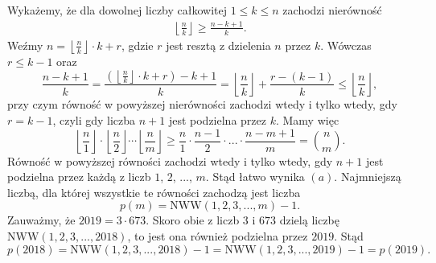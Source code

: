 \noindent
Wykażemy, że dla dowolnej liczby całkowitej $1 \leqslant k \leqslant n$ zachodzi nierówność
\begin{align*}
	\left \lfloor \frac{n}{k} \right \rfloor \geqslant \frac{n - k + 1}{k}.
\end{align*}
Weźmy $n = \left \lfloor \frac{n}{k} \right \rfloor \cdot k + r$, gdzie $r$ jest resztą z dzielenia $n$ przez $k$. Wówczas $r \leqslant k - 1$ oraz 
\[
	\frac{n - k + 1}{k} = \frac{\left (\left \lfloor \frac{n}{k} \right \rfloor \cdot k + r\right ) - k + 1}{k} = \left \lfloor \frac{n}{k} \right \rfloor + \frac{r - (k - 1)}{k} \leqslant \left \lfloor \frac{n}{k} \right \rfloor,
\]
przy czym równość w powyższej nierówności zachodzi wtedy i tylko wtedy, gdy $r = k - 1$, czyli gdy liczba $n + 1$ jest podzielna przez $k$. Mamy więc
\[
\left \lfloor \frac{n}{1} \right \rfloor \cdot \left \lfloor \frac{n}{2} \right \rfloor \cdots \left \lfloor \frac{n}{m} \right \rfloor \geqslant \frac{n}{1} \cdot \frac{n - 1}{2} \cdot ... \cdot \frac{n - m + 1}{m} = {{n}\choose{m}}.
\]
Równość w powyższej równości zachodzi wtedy i tylko wtedy, gdy $n + 1$ jest podzielna przez każdą z liczb $1$, $2$, ..., $m$. Stąd łatwo wynika $(a)$. Najmniejszą liczbą, dla której wszystkie te równości zachodzą jest liczba
\[
	p(m) = \mathrm{NWW}(1, 2, 3, ..., m) - 1.
\]
Zauważmy, że $2019 = 3 \cdot 673$. Skoro obie z liczb $3$ i $673$  dzielą liczbę $\mathrm{NWW}(1, 2, 3, ..., 2018)$, to jest ona również podzielna przez $2019$. Stąd
\[
	p(2018) = \mathrm{NWW}(1, 2, 3, ..., 2018) - 1 = \mathrm{NWW}(1, 2, 3, ..., 2019) - 1 = p(2019). 
\]

